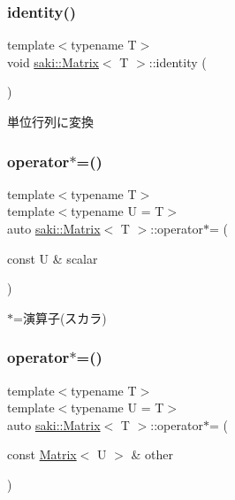 \subsubsection{\texorpdfstring{identity()}{identity()}}
{\footnotesize\ttfamily template$<$typename T$>$ \\
void \mbox{\hyperlink{classsaki_1_1_matrix}{saki\+::\+Matrix}}$<$ T $>$\+::identity (\begin{DoxyParamCaption}{ }\end{DoxyParamCaption})\hspace{0.3cm}{\ttfamily [inline]}}



単位行列に変換 

\mbox{\label{classsaki_1_1_matrix_aae1ffee9f67e7c9893a2329c75bd8a51}} 
\subsubsection{\texorpdfstring{operator$\ast$=()}{operator*=()}\hspace{0.1cm}{\footnotesize\ttfamily [1/2]}}
{\footnotesize\ttfamily template$<$typename T$>$ \\
template$<$typename U  = T$>$ \\
auto \mbox{\hyperlink{classsaki_1_1_matrix}{saki\+::\+Matrix}}$<$ T $>$\+::operator$\ast$= (\begin{DoxyParamCaption}\item[{const U \&}]{scalar }\end{DoxyParamCaption})\hspace{0.3cm}{\ttfamily [inline]}}



$\ast$=演算子(スカラ) 

\mbox{\label{classsaki_1_1_matrix_a66c88e0fcf5b1e86180c097ff24ceff4}} 
\subsubsection{\texorpdfstring{operator$\ast$=()}{operator*=()}\hspace{0.1cm}{\footnotesize\ttfamily [2/2]}}
{\footnotesize\ttfamily template$<$typename T$>$ \\
template$<$typename U  = T$>$ \\
auto \mbox{\hyperlink{classsaki_1_1_matrix}{saki\+::\+Matrix}}$<$ T $>$\+::operator$\ast$= (\begin{DoxyParamCaption}\item[{const \mbox{\hyperlink{classsaki_1_1_matrix}{Matrix}}$<$ U $>$ \&}]{other }\end{DoxyParamCaption})\hspace{0.3cm}{\ttfamily [inline]}}




